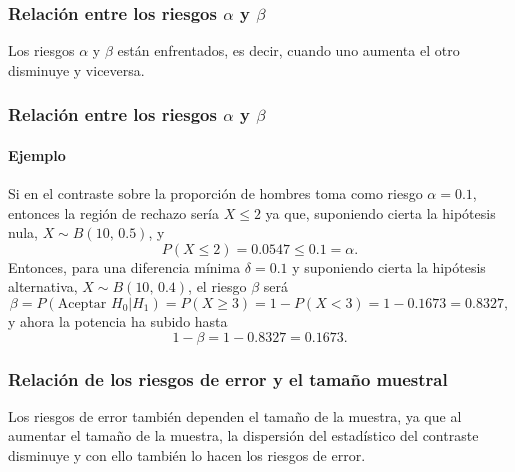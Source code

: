 \begin{frame}
\frametitle{Relación entre los riesgos $\alpha$ y $\beta$}
Los riesgos $\alpha$ y $\beta$ están enfrentados, es decir, cuando uno aumenta el otro disminuye y viceversa.
\begin{center}
\end{center}
\end{frame}



\begin{frame}
\frametitle{Relación entre los riesgos $\alpha$ y $\beta$}
\framesubtitle{Ejemplo}
Si en el contraste sobre la proporción de hombres toma como riesgo $\alpha=0.1$, entonces la región de rechazo sería $X\leq 2$ ya que, suponiendo cierta la hipótesis nula, $X\sim B(10,\, 0.5)$, y 
\[
P(X\leq 2) = 0.0547 \leq 0.1=\alpha.
\]
Entonces, para una diferencia mínima $\delta=0.1$ y suponiendo cierta la hipótesis alternativa, $X\sim B(10,\,0.4)$, el riesgo $\beta$ será
\[
\beta = P(\text{Aceptar }H_0|H_1) = P(X\geq 3) = 1- P(X<3) = 1-0.1673 = 0.8327,
\]
y ahora la potencia ha subido hasta
\[
1-\beta = 1-0.8327 = 0.1673.
\]
\end{frame}


\begin{frame}
\frametitle{Relación de los riesgos de error y el tamaño muestral}
Los riesgos de error también dependen el tamaño de la muestra, ya que al aumentar el tamaño de la muestra, la dispersión del estadístico del contraste disminuye y con ello también lo hacen los riesgos de error.
\begin{center}
\end{center}
\end{frame}


